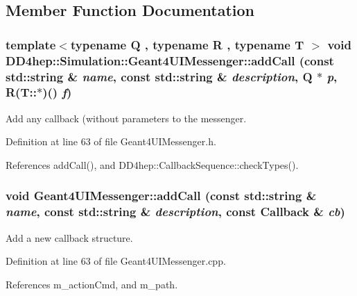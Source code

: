 \subsection{Member Function Documentation}
\hypertarget{class_d_d4hep_1_1_simulation_1_1_geant4_u_i_messenger_afebec6761b3606236fca98853df29eec}{
\subsubsection[{addCall}]{\setlength{\rightskip}{0pt plus 5cm}template$<$typename Q , typename R , typename T $>$ void DD4hep::Simulation::Geant4UIMessenger::addCall (const std::string \& {\em name}, \/  const std::string \& {\em description}, \/  Q $\ast$ {\em p}, \/  R(T::$\ast$)() {\em f})}}
\label{class_d_d4hep_1_1_simulation_1_1_geant4_u_i_messenger_afebec6761b3606236fca98853df29eec}


Add any callback (without parameters to the messenger. 

Definition at line 63 of file Geant4UIMessenger.h.

References addCall(), and DD4hep::CallbackSequence::checkTypes().\hypertarget{class_d_d4hep_1_1_simulation_1_1_geant4_u_i_messenger_a42b963fb8d55b8fa2f1586098b383d61}{
\subsubsection[{addCall}]{\setlength{\rightskip}{0pt plus 5cm}void Geant4UIMessenger::addCall (const std::string \& {\em name}, \/  const std::string \& {\em description}, \/  const {\bf Callback} \& {\em cb})}}
\label{class_d_d4hep_1_1_simulation_1_1_geant4_u_i_messenger_a42b963fb8d55b8fa2f1586098b383d61}


Add a new callback structure. 

Definition at line 63 of file Geant4UIMessenger.cpp.

References m\_\-actionCmd, and m\_\-path.


